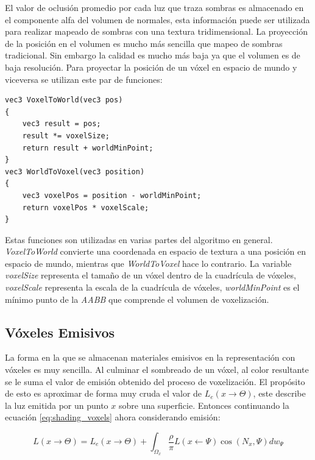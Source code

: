 El valor de oclusión promedio por cada luz que traza sombras es almacenado en el componente alfa del volumen de normales, esta información puede ser utilizada para realizar mapeado de sombras con una textura tridimensional. La proyección de la posición en el volumen es mucho más sencilla que mapeo de sombras tradicional. Sin embargo la calidad es mucho más baja ya que el volumen es de baja resolución. Para proyectar la posición de un vóxel en espacio de mundo y viceversa se utilizan este par de funciones:
\\
\begin{lstlisting}[caption={Transformación de espacio entre coordenadas de textura y posiciones de mundo.}, label=SpaceTransform]
vec3 VoxelToWorld(vec3 pos)
{
	vec3 result = pos;
	result *= voxelSize;
	return result + worldMinPoint;
}
vec3 WorldToVoxel(vec3 position)
{
    vec3 voxelPos = position - worldMinPoint;
    return voxelPos * voxelScale;
}
\end{lstlisting}

Estas funciones son utilizadas en varias partes del algoritmo en general. \emph{VoxelToWorld} convierte una coordenada en espacio de textura a una posición en espacio de mundo, mientras que \emph{WorldToVoxel} hace lo contrario. La variable \emph{voxelSize} representa el tamaño de un vóxel dentro de la cuadrícula de vóxeles, \emph{voxelScale} representa la escala de la cuadrícula de vóxeles, \emph{worldMinPoint} es el mínimo punto de la \emph{AABB} que comprende el volumen de voxelización.

\subsection{Vóxeles Emisivos}
La forma en la que se almacenan materiales emisivos en la representación con vóxeles es muy sencilla. Al culminar el sombreado de un vóxel, al color resultante se le suma el valor de emisión obtenido del proceso de voxelización. El propósito de esto es aproximar de forma muy cruda el valor de $L_e(x\to\Theta)$, este describe la luz emitida por un punto $x$ sobre una superficie. Entonces continuando la ecuación \ref{eq:shading_voxels} ahora considerando emisión:

\begin{equation}
		L(x\to\Theta) = L_e(x\to\Theta) + \int_{\Omega_{x}}{\frac{\rho}{\pi}L(x\gets\Psi)\cos(N_{x}, \Psi)dw_{\Psi}}
\end{equation}

